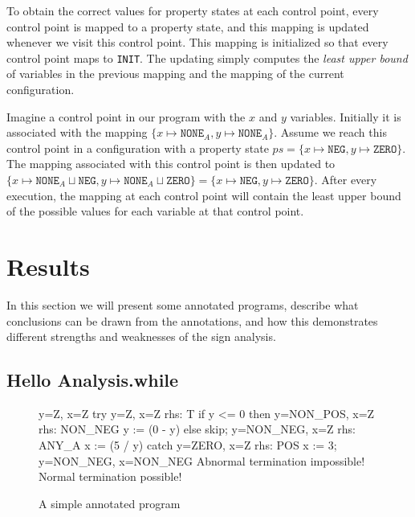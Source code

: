 \documentclass[a4paper,11pt]{article}
\begin{document}
To obtain the correct values for property states at each control point,
every control point is mapped to a property state, and this mapping is updated
whenever we visit this control point.
This mapping is initialized so that every control point maps to \verb|INIT|.
The updating simply computes the \emph{least upper bound} of variables in the previous mapping and the mapping of the current configuration.

Imagine a control point in our program with the $x$ and $y$ variables.
Initially it is associated with the mapping $\{x \mapsto \texttt{NONE}_A, y \mapsto \texttt{NONE}_A \}$.
Assume we reach this control point in a configuration with a property state 
$ps = \{x \mapsto \texttt{NEG}, y \mapsto \texttt{ZERO} \}$.
The mapping associated with this control point is then updated to
$\{ x \mapsto \texttt{NONE}_A \sqcup \texttt{NEG}, y \mapsto \texttt{NONE}_A \sqcup \texttt{ZERO} \} 
= \{x \mapsto \texttt{NEG}, y \mapsto \texttt{ZERO} \} $.
After every execution, the mapping at each control point will
contain the least upper bound of the possible values for each variable at that control point.

\clearpage
\section{Results}

In this section we will present some annotated programs, describe what conclusions can be drawn from the annotations,
and how this demonstrates different strengths and weaknesses of the sign analysis.

\subsection{Hello Analysis.while}

\begin{figure}[h!]
\centering
\begin{verbatimtab}[4]
{y=Z, x=Z}
try
    {y=Z, x=Z} rhs: T
    if y <= 0 then
        {y=NON_POS, x=Z} rhs: NON_NEG
        y := (0 - y)
    else
        skip;
    {y=NON_NEG, x=Z} rhs: ANY_A
    x := (5 / y)
catch
    {y=ZERO, x=Z} rhs: POS
    x := 3;
{y=NON_NEG, x=NON_NEG}
Abnormal termination impossible!
Normal termination possible!
\end{verbatimtab}

\label{hello_analysis.while}
\caption{A simple annotated program}
\end{figure}
\end{document}
